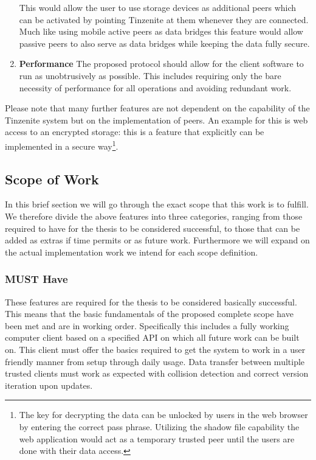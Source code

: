 \begin{enumerate}
    This would allow the user to use storage devices as additional peers which can be activated by pointing Tinzenite at them whenever they are connected.
    Much like using mobile active peers as data bridges this feature would allow passive peers to also serve as data bridges while keeping the data fully secure.
\item \textbf{Performance}
    The proposed protocol should allow for the client software to run as unobtrusively as possible.
    This includes requiring only the bare necessity of performance for all operations and avoiding redundant work.
\end{enumerate}

Please note that many further features are not dependent on the capability of the Tinzenite system but on the implementation of peers.
An example for this is web access to an encrypted storage: this is a feature that explicitly can be implemented in a secure way\footnote{The key for decrypting the data can be unlocked by users in the web browser by entering the correct pass phrase. Utilizing the shadow file capability the web application would act as a temporary trusted peer until the users are done with their data access.}.

\subsection{Scope of Work}
\label{sub:Scope of Work}

In this brief section we will go through the exact scope that this work is to fulfill.
We therefore divide the above features into three categories, ranging from those required to have for the thesis to be considered successful, to those that can be added as extras if time permits or as future work.
Furthermore we will expand on the actual implementation work we intend for each scope definition.

\subsubsection{MUST Have}
\label{subs:MUST Have}

These features are required for the thesis to be considered basically successful.
This means that the basic fundamentals of the proposed complete scope have been met and are in working order.
Specifically this includes a fully working computer client based on a specified API on which all future work can be built on.
This client must offer the basics required to get the system to work in a user friendly manner from setup through daily usage.
Data transfer between multiple trusted clients must work as expected with collision detection and correct version iteration upon updates.

